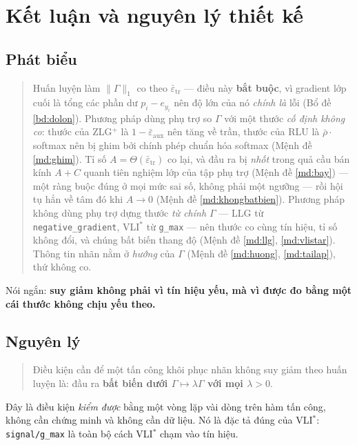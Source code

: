 \documentclass[11pt,a4paper]{article}
\theoremstyle{remark}
\newcommand{\epstr}{\bar\varepsilon_{\mathrm{tr}}}
\newcommand{\epsaux}{\bar\varepsilon_{\mathrm{aux}}}
\newcommand{\code}[1]{\texttt{\small #1}}
\begin{document}
\section{Kết luận và nguyên lý thiết kế}
\label{sec:nguyenly}

\subsection{Phát biểu}

\begin{quote}
Huấn luyện làm $\|\Gamma\|_1$ co theo $\epstr$ --- điều này \textbf{bắt buộc},
vì gradient lớp cuối là tổng các phần dư $p_i-e_{y_i}$ nên độ lớn của nó
\emph{chính là} lỗi (Bổ đề \ref{bd:dolon}). Phương pháp dùng phụ trợ so
$\Gamma$ với một thước \emph{cố định không co}: thước của ZLG$^+$ là
$1-\epsaux$ nên tăng về trần, thước của RLU là $\bar\rho\cdot$softmax nên bị
ghim bởi chính phép chuẩn hóa softmax (Mệnh đề \ref{md:ghim}). Tỉ số
$A=\Theta(\epstr)$ co lại, và đầu ra bị \emph{nhốt} trong quả cầu bán kính
$A+C$ quanh tiên nghiệm lớp của tập phụ trợ (Mệnh đề \ref{md:bay}) --- một
ràng buộc đúng ở mọi mức sai số, không phải một ngưỡng --- rồi hội tụ hẳn về
tâm đó khi $A\to0$ (Mệnh đề \ref{md:khongbatbien}). Phương pháp không dùng phụ trợ dựng
thước \emph{từ chính $\Gamma$} --- LLG từ \code{negative\_gradient}, VLI$^*$
từ \code{g\_max} --- nên thước co cùng tín hiệu, tỉ số không đổi, và chúng
bất biến thang độ (Mệnh đề \ref{md:llg}, \ref{md:vlistar}). Thông tin nhãn
nằm ở \emph{hướng} của $\Gamma$ (Mệnh đề \ref{md:huong}, \ref{md:tailap}), thứ
không co.
\end{quote}

Nói ngắn: \textbf{suy giảm không phải vì tín hiệu yếu, mà vì được đo bằng một
cái thước không chịu yếu theo.}

\subsection{Nguyên lý}

\begin{quote}
Điều kiện cần để một tấn công khôi phục nhãn không suy giảm theo huấn luyện
là: đầu ra \textbf{bất biến dưới $\Gamma\mapsto\lambda\Gamma$ với mọi
$\lambda>0$}.
\end{quote}

Đây là điều kiện \emph{kiểm được} bằng một vòng lặp vài dòng trên hàm tấn
công, không cần chứng minh và không cần dữ liệu. Nó là đặc tả đúng của
VLI$^*$: \code{signal/g\_max} là toàn bộ cách VLI$^*$ chạm vào tín hiệu.
\end{document}
